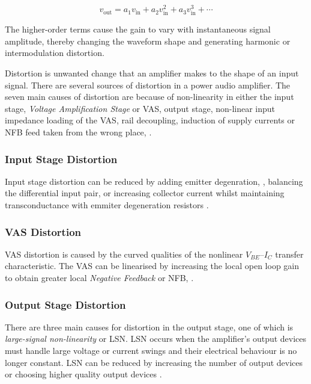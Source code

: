 \begin{equation}
	v_{\mathrm{out}}
	=
	a_1v_{\mathrm{in}}
	+
	a_2v_{\mathrm{in}}^2
	+
	a_3v_{\mathrm{in}}^3
	+
	\cdots
\end{equation}

The higher-order terms cause the gain to vary with instantaneous signal amplitude, thereby changing the waveform shape and generating harmonic or intermodulation distortion.

Distortion is unwanted change that an amplifier makes to the shape of an input signal. There are several sources of distortion in a power audio amplifier. The seven main causes of distortion are because of non-linearity in either the input stage, \textit{Voltage Amplification Stage} or VAS, output stage, non-linear input impedance loading of the VAS,  rail decoupling, induction of supply currents or NFB feed taken from the wrong place, \cite[p.~65-67]{Self:2009}.

\subsubsection{Input Stage Distortion}

Input stage distortion can be reduced by adding emitter degenration, \cite[p.~79-80]{Self:2009}, balancing the differential input pair, \cite[p.~80-82]{Self:2009} or increasing collector current whilst maintaining transconductance with emmiter degeneration resistors \cite[p.~86-87]{Self:2009}.

\subsubsection{VAS Distortion}

VAS distortion is caused by the curved qualities of the nonlinear \(V_{BE}\)--\(I_C\) transfer characteristic. The VAS can be linearised by increasing the local open loop gain to obtain greater local  \textit{Negative Feedback} or NFB, \cite{Self:2009}.

\subsubsection{Output Stage Distortion}

There are three main causes for distortion in the output stage, one of which is \textit{large-signal non-linearity} or LSN. LSN occurs when the amplifier's output devices must handle large voltage or current swings and their electrical behaviour is no longer constant. LSN can be reduced by increasing the number of output devices or choosing higher quality output devices \cite[p.~164-166]{Self:2009}.

